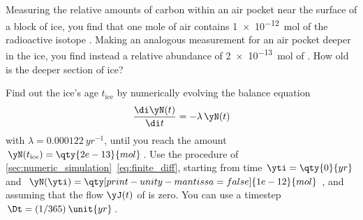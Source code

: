 %
%
\begin{exercise}
  Measuring the relative amounts of carbon within an air pocket near the surface of a block of ice, you find that one mole of air contains \qty[print-unity-mantissa=false]{1e-12}{mol} of the radioactive isotope . Making an analogous measurement for an air pocket deeper in the ice, you find instead a relative abundance of \qty{2e-13}{mol} of . How old is the deeper section of ice?

  Find out the ice's age $t_{\text{ice}}$ by numerically evolving the balance equation
  $$\frac{\di\yN(t)}{\di t} = -\lambda\,\yN(t)$$
  with $\lambda=\qty{0.000122}{yr^{-1}}$, until you reach the amount $\yN(t_{\text{ice}})= \qty{2e-13}{mol}$.
  Use the procedure of \autoref{sec:numeric_simulation}{\eqn~\eqref{eq:finite_diff}}, starting from time $\yti=\qty{0}{yr}$ and $\yN(\yti)=\qty[print-unity-mantissa=false]{1e-12}{mol}$, and assuming that the flow $\yJ(t)$ of  is zero. You can use a timestep $\Dt = (1/365)\:\unit{yr}$.
\end{exercise}


